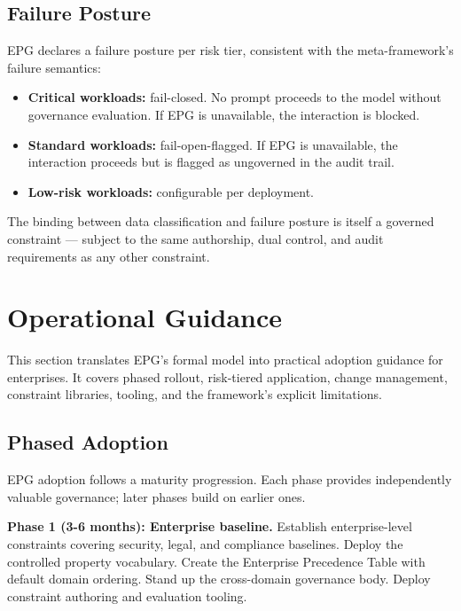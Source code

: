 \subsection{Failure Posture}


EPG declares a failure posture per risk tier, consistent with the meta-framework's failure semantics:

\begin{itemize}
  \item \textbf{Critical workloads:} fail-closed. No prompt proceeds to the model without governance evaluation. If EPG is unavailable, the interaction is blocked.
  \item \textbf{Standard workloads:} fail-open-flagged. If EPG is unavailable, the interaction proceeds but is flagged as ungoverned in the audit trail.
  \item \textbf{Low-risk workloads:} configurable per deployment.
\end{itemize}


The binding between data classification and failure posture is itself a governed constraint --- subject to the same authorship, dual control, and audit requirements as any other constraint.



\section{Operational Guidance}
\label{sec:prompt-9}


This section translates EPG's formal model into practical adoption guidance for enterprises. It covers phased rollout, risk-tiered application, change management, constraint libraries, tooling, and the framework's explicit limitations.

\subsection{Phased Adoption}


EPG adoption follows a maturity progression. Each phase provides independently valuable governance; later phases build on earlier ones.

\textbf{Phase 1 (3-6 months): Enterprise baseline.} Establish enterprise-level constraints covering security, legal, and compliance baselines. Deploy the controlled property vocabulary. Create the Enterprise Precedence Table with default domain ordering. Stand up the cross-domain governance body. Deploy constraint authoring and evaluation tooling.

